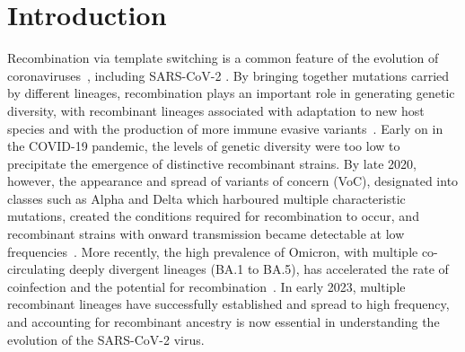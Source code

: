 \documentclass{article}
\begin{document}
\section{Introduction}
Recombination via template switching is a common feature
of the evolution of coronaviruses~\citep{Graham2010-xe,De_Klerk2022-tt},
including SARS-CoV-2
\citep{VanInsberghe2021-eu,Jackson2021-ik,Ignatieva2021-rg}. By bringing
together mutations carried by different lineages, recombination plays an
important role in generating genetic diversity, with recombinant lineages
associated with adaptation to new host species and with the production of more
immune evasive variants~\citep{Graham2010-xe,De_Klerk2022-tt}.
Early on in the COVID-19 pandemic, the levels of genetic diversity
were too low to precipitate the emergence of distinctive recombinant strains.
By late 2020, however, the appearance and
spread of variants of concern (VoC), designated into classes such as Alpha and
Delta which harboured multiple characteristic mutations,
created the conditions required for recombination to occur,
and recombinant strains with onward transmission became detectable at
low frequencies~\citep{Jackson2021-ik}.
More recently, the high prevalence of Omicron,
with multiple co-circulating deeply divergent lineages (BA.1 to BA.5), has
accelerated the rate of coinfection and the potential for
recombination~\citep{Bal2022-hq}.
In early 2023, multiple recombinant lineages have successfully
established and spread to high frequency, and accounting for recombinant
ancestry is now essential in understanding the evolution of the SARS-CoV-2
virus.
\end{document}
